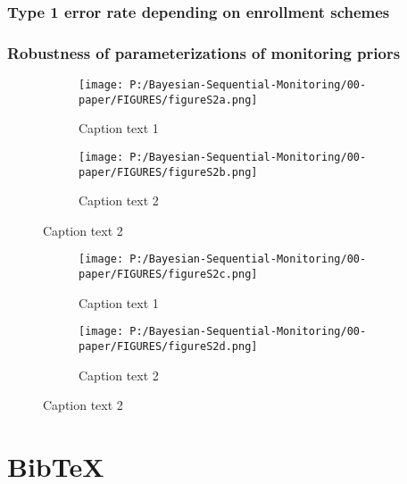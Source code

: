 \documentclass[12pt]{article}
\begin{document}
\subsubsection{Type 1 error rate depending on enrollment schemes}

\newpage
\subsubsection{Robustness of parameterizations of monitoring priors}
\begin{figure}
  \begin{subfigure}{7in}
    \centering\texttt{[image: P:/Bayesian-Sequential-Monitoring/00-paper/FIGURES/figureS2a.png]}
    \caption{Caption text 1}
  \end{subfigure}
  \begin{subfigure}{7in}
    \centering\texttt{[image: P:/Bayesian-Sequential-Monitoring/00-paper/FIGURES/figureS2b.png]}
    \caption{Caption text 2}
  \end{subfigure}
 \end{figure}
\begin{figure}
  \begin{subfigure}{7in}
    \centering\texttt{[image: P:/Bayesian-Sequential-Monitoring/00-paper/FIGURES/figureS2c.png]}
    \caption{Caption text 1}
  \end{subfigure}
  \begin{subfigure}{7in}
    \centering\texttt{[image: P:/Bayesian-Sequential-Monitoring/00-paper/FIGURES/figureS2d.png]}
    \caption{Caption text 2}
  \end{subfigure}
\end{figure}

\section{BibTeX}

 
 		
\end{document}
